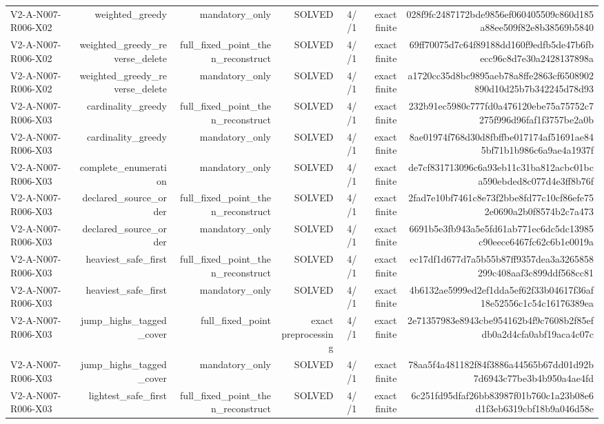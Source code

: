 {\begin{longtable}{lrrrrrr}
V2-A-N007-R006-X02 & weighted\_greedy & mandatory\_only & SOLVED & 4//1 & exact finite & 028f9fc2487172bde9856ef060405509c860d185a88ee509f82e8b38569b5840 \\
V2-A-N007-R006-X02 & weighted\_greedy\_reverse\_delete & full\_fixed\_point\_then\_reconstruct & SOLVED & 4//1 & exact finite & 69ff70075d7c64f89188dd160f9edfb5de47b6fbecc96c8d7e30a2428137898a \\
V2-A-N007-R006-X02 & weighted\_greedy\_reverse\_delete & mandatory\_only & SOLVED & 4//1 & exact finite & a1720cc35d8bc9895aeb78a8ffe2863cf6508902890d10d25b7b342245d78d93 \\
V2-A-N007-R006-X03 & cardinality\_greedy & full\_fixed\_point\_then\_reconstruct & SOLVED & 4//1 & exact finite & 232b91ec5980c777fd0a476120ebe75a75752c7275f996d96faf1f3757be2a0b \\
V2-A-N007-R006-X03 & cardinality\_greedy & mandatory\_only & SOLVED & 4//1 & exact finite & 8ae01974f768d30d8fbffbe017174af51691ae845bf71b1b986c6a9ae4a1937f \\
V2-A-N007-R006-X03 & complete\_enumeration & mandatory\_only & SOLVED & 4//1 & exact finite & de7cf831713096c6a93eb11c31ba812acbc01bca590ebded8c077d4e3ff8b76f \\
V2-A-N007-R006-X03 & declared\_source\_order & full\_fixed\_point\_then\_reconstruct & SOLVED & 4//1 & exact finite & 2fad7e10bf7461c8e73f2bbe8fd77c10cf86efe752e0690a2b0f8574b2c7a473 \\
V2-A-N007-R006-X03 & declared\_source\_order & mandatory\_only & SOLVED & 4//1 & exact finite & 6691b5e3fb943a5e5fd61ab771ec6dc5dc13985c90eece6467fc62c6b1e0019a \\
V2-A-N007-R006-X03 & heaviest\_safe\_first & full\_fixed\_point\_then\_reconstruct & SOLVED & 4//1 & exact finite & ec17df1d677d7a5b55b87ff9357dea3a3265858299c408aaf3c899ddf568cc81 \\
V2-A-N007-R006-X03 & heaviest\_safe\_first & mandatory\_only & SOLVED & 4//1 & exact finite & 4b6132ae5999ed2ef1dda5ef62f33b04617f36af18e52556c1c54c16176389ea \\
V2-A-N007-R006-X03 & jump\_highs\_tagged\_cover & full\_fixed\_point & exact preprocessing & 4//1 & exact finite & 2e71357983e8943cbe954162b4f9c7608b2f85efdb0a2d4cfa0abf19aca4c07c \\
V2-A-N007-R006-X03 & jump\_highs\_tagged\_cover & mandatory\_only & SOLVED & 4//1 & exact finite & 78aa5f4a481182f84f3886a44565b67dd01d92b7d6943c77be3b4b950a4ae4fd \\
V2-A-N007-R006-X03 & lightest\_safe\_first & full\_fixed\_point\_then\_reconstruct & SOLVED & 4//1 & exact finite & 6c251fd95dfaf26bb83987f01b760c1a23b08e6d1f3eb6319cbf18b9a046d58e \\

\end{longtable}}
